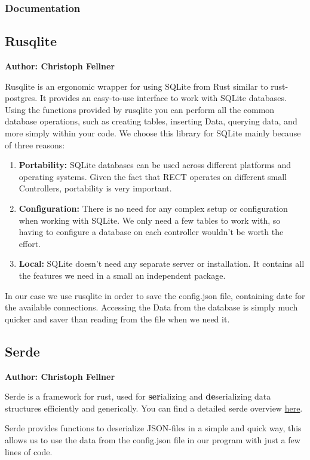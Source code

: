 \subsubsection{Documentation}

\subsection{Rusqlite}
\textbf{Author: Christoph Fellner}

Rusqlite is an ergonomic wrapper for using SQLite from Rust similar to rust-postgres. It provides an easy-to-use interface to work with SQLite databases. Using the functions provided by rusqlite you can perform all the common database operations, such as creating tables, inserting Data, querying data, and more simply within your code. 
We choose this library for SQLite mainly because of three reasons:
\begin{enumerate}
    \item \textbf{Portability:} SQLite databases can be used across different platforms and operating systems. Given the fact that RECT operates on different small Controllers, portability is very important.
    \item \textbf{Configuration:} There is no need for any complex setup or configuration when working with SQLite. We only need a few tables to work with, so having to configure a database on each controller wouldn't be worth the effort.
    \item \textbf{Local:} SQLite doesn't need any separate server or installation. It contains all the features we need in a small an independent package.
\end{enumerate}

In our case we use rusqlite in order to save the config.json file, containing date for the available connections. Accessing the Data from the database is simply much quicker and saver than reading from the file when we need it. 

\subsection{Serde}
\textbf{Author: Christoph Fellner}

Serde is a framework for rust, used for \textbf{ser}ializing and \textbf{de}serializing data structures efficiently and generically. You can find a detailed serde overview \href{https://serde.rs/}{here}.

Serde provides functions to deserialize JSON-files in a simple and quick way, this allows us to use the data from the config.json file in our program with just a few lines of code.

